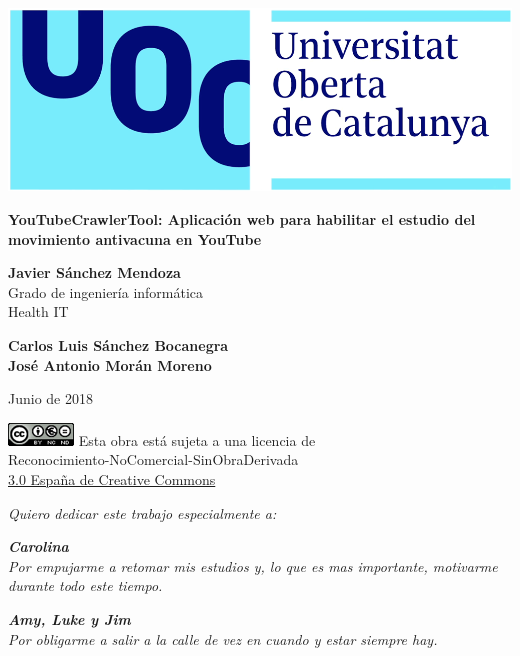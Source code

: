\documentclass[11pt,a4paper]{article}
\begin{document}
\begin{titlepage}
\includegraphics[scale=0.2,right,valign=t]{uoc-logo.png}
\vspace*{\fill}
\begin{flushleft}
{\LARGE \textbf{YouTubeCrawlerTool: Aplicación web para habilitar el estudio del movimiento antivacuna en YouTube}}
\end{flushleft}
\begin{flushleft}
\textbf{Javier Sánchez Mendoza}\\
Grado de ingeniería informática\\
Health IT
\end{flushleft}
\begin{flushleft}
\textbf{Carlos Luis Sánchez Bocanegra}\\
\textbf{José Antonio Morán Moreno}
\end{flushleft}
\begin{flushleft}
Junio de 2018  
\end{flushleft}
\end{titlepage}


\begin{titlepage}
\vspace*{\fill}
\begin{flushleft}
\includegraphics[scale=1,left]{licencia-cc.png}
Esta obra está sujeta a una licencia de\\
Reconocimiento-NoComercial-SinObraDerivada\\
\href{http://creativecommons.org/licenses/by-nc-nd/3.0/es/}{3.0 España de Creative Commons}
\end{flushleft}
\end{titlepage}



\begin{flushleft}
\textit{Quiero dedicar este trabajo especialmente a:}
\linebreak
 
\textbf{\textit{Carolina}} \\
\textit{Por empujarme a retomar mis estudios y, lo que es mas importante, motivarme durante todo este tiempo.}
\linebreak

\textbf{\textit{Amy, Luke y Jim}}\\
\textit{Por obligarme a salir a la calle de vez en cuando y estar siempre hay.}
\linebreak
\end{flushleft}
\newpage 
\end{document}
